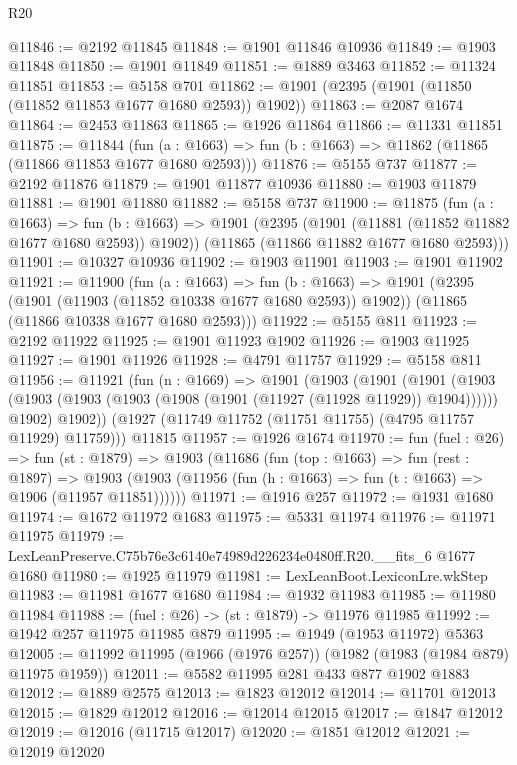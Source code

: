 \begin{lexlean}{R20}
\begin{coremodule}
@11846 := @2192 @11845
@11848 := @1901 @11846 @10936
@11849 := @1903 @11848
@11850 := @1901 @11849
@11851 := @1889 @3463
@11852 := @11324 @11851
@11853 := @5158 @701
@11862 := @1901 (@2395 (@1901 (@11850 (@11852 @11853 @1677 @1680 @2593)) @1902))
@11863 := @2087 @1674
@11864 := @2453 @11863
@11865 := @1926 @11864
@11866 := @11331 @11851
@11875 := @11844
    (fun (a : @1663) => fun (b : @1663) => @11862 (@11865 (@11866 @11853 @1677 @1680 @2593)))
@11876 := @5155 @737
@11877 := @2192 @11876
@11879 := @1901 @11877 @10936
@11880 := @1903 @11879
@11881 := @1901 @11880
@11882 := @5158 @737
@11900 := @11875
    (fun (a : @1663) =>
    fun (b : @1663) =>
    @1901
      (@2395 (@1901 (@11881 (@11852 @11882 @1677 @1680 @2593)) @1902))
      (@11865 (@11866 @11882 @1677 @1680 @2593)))
@11901 := @10327 @10936
@11902 := @1903 @11901
@11903 := @1901 @11902
@11921 := @11900
    (fun (a : @1663) =>
    fun (b : @1663) =>
    @1901
      (@2395 (@1901 (@11903 (@11852 @10338 @1677 @1680 @2593)) @1902))
      (@11865 (@11866 @10338 @1677 @1680 @2593)))
@11922 := @5155 @811
@11923 := @2192 @11922
@11925 := @1901 @11923 @1902
@11926 := @1903 @11925
@11927 := @1901 @11926
@11928 := @4791 @11757
@11929 := @5158 @811
@11956 := @11921
    (fun (n : @1669) =>
    @1901
      (@1903
        (@1901
          (@1901
            (@1903 (@1903 (@1903 (@1903 (@1908 (@1901 (@11927 (@11928 @11929)) @1904))))))
            @1902)
          @1902))
      (@1927 (@11749 @11752 (@11751 @11755) (@4795 @11757 @11929) @11759)))
    @11815
@11957 := @1926 @1674
@11970 := fun (fuel : @26) =>
  fun (st : @1879) =>
  @1903
    (@11686
      (fun (top : @1663) =>
      fun (rest : @1897) =>
      @1903 (@1903 (@11956 (fun (h : @1663) => fun (t : @1663) => @1906 (@11957 @11851))))))
@11971 := @1916 @257
@11972 := @1931 @1680
@11974 := @1672 @11972 @1683
@11975 := @5331 @11974
@11976 := @11971 @11975
@11979 := LexLeanPreserve.C75b76e3c6140e74989d226234e0480ff.R20.__fits_6 @1677 @1680
@11980 := @1925 @11979
@11981 := LexLeanBoot.LexiconLre.wkStep
@11983 := @11981 @1677 @1680
@11984 := @1932 @11983
@11985 := @11980 @11984
@11988 := (fuel : @26) -> (st : @1879) -> @11976 @11985
@11992 := @1942 @257 @11975 @11985 @879
@11995 := @1949 (@1953 @11972) @5363
@12005 := @11992 @11995 (@1966 (@1976 @257)) (@1982 (@1983 (@1984 @879) @11975 @1959))
@12011 := @5582 @11995 @281 @433 @877 @1902 @1883
@12012 := @1889 @2575
@12013 := @1823 @12012
@12014 := @11701 @12013
@12015 := @1829 @12012
@12016 := @12014 @12015
@12017 := @1847 @12012
@12019 := @12016 (@11715 @12017)
@12020 := @1851 @12012
@12021 := @12019 @12020

\end{coremodule}
\end{lexlean}
